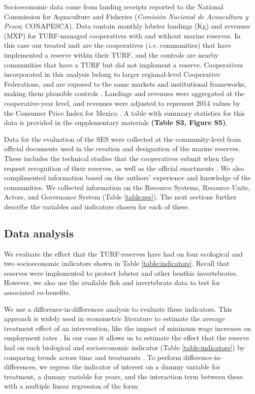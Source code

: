 \documentclass{frontiersSCNS}
\begin{document}
Socioeconomic data come from landing receipts reported to the National
Commission for Aquaculture and Fisheries (\emph{Comisión Nacional de
Acuacultura y Pesca}; CONAPESCA). Data contain monthly lobster landings
(Kg) and revenues (MXP) for TURF-managed cooperatives with and without
marine reserves. In this case our treated unit are the cooperatives
(\emph{i.e.} communities) that have implemented a reserve within their
TURF, and the controls are nearby communities that have a TURF but did
not implement a reserve. Cooperatives incorporated in this analysis
belong to larger regional-level Cooperative Federations, and are exposed
to the same markets and institutional frameworks, making them plausible
controls \citep{mccay_2017,ayer_2018}. Landings and revenues were
aggregated at the cooperative-year level, and revenues were adjusted to
represent 2014 values by the Consumer Price Index for Mexico
\citep{oecd_2017}. A table with summary statistics for this data is
provided in the supplementary materials \textbf{(Table S3, Figure S5)}.

Data for the evaluation of the SES were collected at the community-level
from official documents used in the creation and designation of the
marine reserves. These includes the technical studies that the
cooperatives submit when they request recognition of their reserves, as
well as the official enactments
\citep{dof_website_2012,dof_website_2013,dof_website_2018}. We also
complimented information based on the authors' experience and knowledge
of the communities. We collected information on the Resource Systems,
Resource Units, Actors, and Governance System (Table \ref{table:ses}).
The next sections further describe the variables and indicators chosen
for each of these.

\hypertarget{data-analysis}{%
\subsection{Data analysis}\label{data-analysis}}

We evaluate the effect that the TURF-reserves have had on four
ecological and two socioeconomic indicators shown in Table
\ref{table:indicators}. Recall that reserves were implemented to protect
lobster and other benthic invertebrates. However, we also use the
available fish and invertebrate data to test for associated co-benefits.

We use a difference-in-differences analysis to evaluate these
indicators. This approach is widely used in econometric literature to
estimate the average treatment effect of an intervention, like the
impact of minimum wage increases on employment rates \citep{card_1994}.
In our case it allows us to estimate the effect that the reserve had on
each biological and socioeconomic indicator (Table
\ref{table:indicators}) by comparing trends across time and treatments
\citep{moland_2013,Villasenor-Derbez_2018}. To perform
difference-in-differences, we regress the indicator of interest on a
dummy variable for treatment, a dummy variable for years, and the
interaction term between these with a multiple linear regression of the
form:
\end{document}
